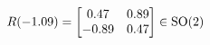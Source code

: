 \documentclass[preview]{standalone}
\begin{document}
\begin{align*}
\special{dvisvgm:raw <g id='unique000'>}R(-1.09) = \begin{bmatrix} 0.47 & 0.89 \\ -0.89 & 0.47 \end{bmatrix} \in \text{SO}(2)\special{dvisvgm:raw </g>}
\end{align*}
\end{document}
